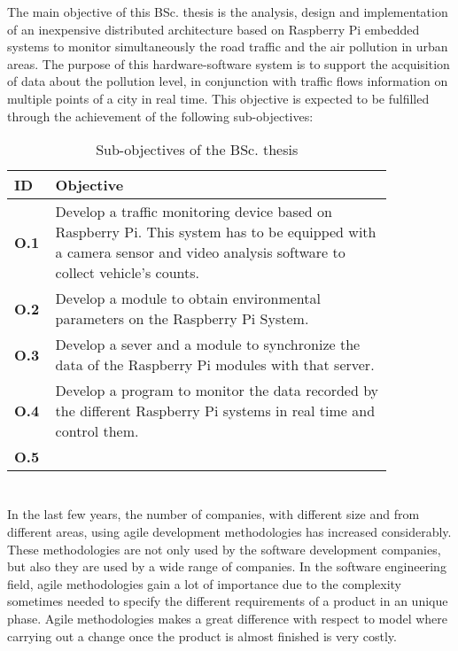 \documentclass{pre-tfg}
\begin{document}
The main objective of this BSc. thesis is the analysis, design and implementation of an inexpensive distributed architecture based on Raspberry Pi embedded systems to monitor simultaneously the road traffic and the air pollution in urban areas. The purpose of this hardware-software system is to support the acquisition of data about the pollution level, in conjunction with traffic flows information on multiple points of a city in real time. This objective is expected to be fulfilled through the achievement of the following sub-objectives:

\begin{table}[!h]
	\centering
	\caption{Sub-objectives of the BSc. thesis}
	\label{tab:sub-objectives}
	
	\begin{tabular}{m{0.05\linewidth}m{0.8\linewidth}}
		\textbf{ID} & \textbf{Objective} \\
		\hline
		
		\textbf{O.1}& Develop a traffic monitoring device based on Raspberry Pi. This system has to be equipped with a camera sensor and video analysis software to collect vehicle’s counts.  \\
		
		\textbf{O.2}& Develop a module to obtain environmental parameters on the Raspberry Pi System.  \\
		
		\textbf{O.3}& Develop a sever and a module to synchronize the data of the Raspberry Pi modules with that server.  \\
		
		\textbf{O.4}& Develop a program to monitor the data recorded by the different Raspberry Pi systems in real time and control them.  \\
		
		\textbf{O.5}& \REDNOTE{------------------------------------------------------------}  \\
		
		\hline
	\end{tabular}
\end{table}


\section{}

In the last few years, the number of companies, with different size and from different areas, using agile development methodologies has increased considerably. These methodologies are not only used by the software development companies, but also they are used by a wide range of companies. In the software engineering field, agile methodologies gain a lot of importance due to the complexity sometimes needed to specify the different requirements of a product in an unique phase. Agile methodologies makes a great difference with respect to  model where carrying out a change once the product is almost finished is very costly.
\end{document}
